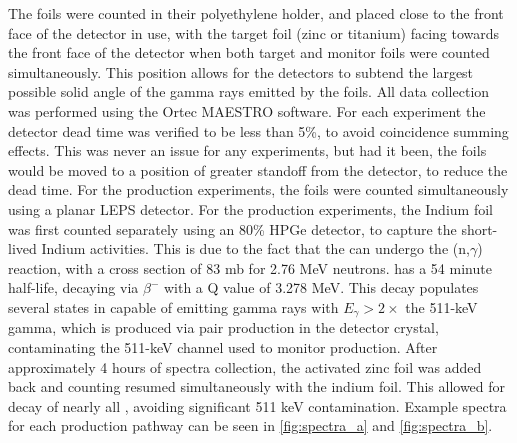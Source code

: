 \documentclass[5p]{elsarticle}
\begin{document}
The foils were counted in their polyethylene holder, and placed close to the front face of the detector in use, with the target foil (zinc or titanium) facing towards the front face of the detector when both target and monitor foils were counted simultaneously. This position allows for the detectors to subtend the largest possible solid angle of the gamma rays emitted by the foils. All data collection was performed using the Ortec MAESTRO software. For each experiment the detector dead time was verified to be less than 5\%, to avoid coincidence summing effects. This was never an issue for any experiments, but had it been, the foils would be moved to a position of greater standoff from the detector, to reduce the dead time.  For the   production experiments, the foils were counted simultaneously using a planar LEPS detector. For the  production experiments, the Indium foil was first counted separately using an 80\% HPGe detector, to capture the short-lived Indium activities. This is due to the fact that the  can undergo the (n,$\gamma$) reaction, with a cross section of 83 mb for 2.76 MeV neutrons.  has a 54 minute half-life, decaying via $\beta^-$ with a Q value of 3.278 MeV. This decay populates several states in  capable of emitting gamma rays with $E_\gamma > 2 \times$ the 511-keV gamma, which is produced via pair production in the detector crystal, contaminating the 511-keV channel used to monitor   production. After approximately 4 hours of spectra collection, the activated zinc foil was added back and counting resumed simultaneously with the indium foil. This allowed for decay of nearly all , avoiding significant 511 keV contamination. Example spectra for each production pathway can be seen in \autoref{fig:spectra_a} and \autoref{fig:spectra_b}.
\end{document}
